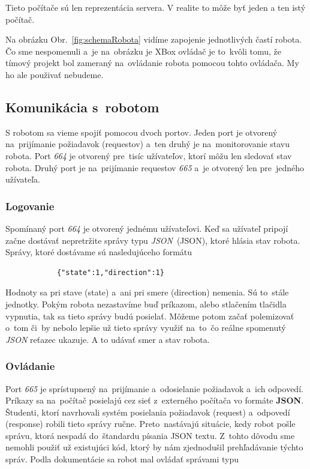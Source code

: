 \noindent Tieto počítače sú len reprezentácia servera. V realite to môže byť jeden a ten istý počítač.

\noindent Na obrázku Obr.~\ref{fig:schemaRobota} vidíme zapojenie jednotlivých častí robota. Čo sme nespomenuli a~je na~obrázku je XBox ovládač
je to~kvôli tomu, že tímový projekt bol zameraný na~ovládanie robota pomocou tohto ovládača. My ho ale použivať nebudeme.

\subsection{Komunikácia s~robotom}

S robotom sa vieme spojiť pomocou dvoch portov. Jeden port je otvorený na~prijímanie požiadavok (requestov) a~ten druhý je na~monitorovanie
stavu robota. Port \textit{664} je otvorený pre~tisíc užívateľov, ktorí môžu len sledovať stav robota. Druhý port je na~prijímanie requestov
\textit{665} a~je otvorený len pre~jedného užívateľa.

\subsubsection{Logovanie}
\label{sec:logovanie}

	Spomínaný port \textit{664} je otvorený jednému užívateľovi. Keď sa užívateľ pripojí začne dostávať nepretržite správy typu
	\textit{JSON}~(\acrlong{JSON}), ktoré hlásia stav robota. Správy, ktoré dostávame sú nasledujúceho formátu

	\begin{lstlisting}
			{"state":1,"direction":1}
	\end{lstlisting}

	Hodnoty sa pri stave (state) a~ani pri smere (direction) nemenia. Sú to~stále jednotky. Pokým robota nezastavíme buď príkazom, alebo
	stlačením tlačidla vypnutia, tak sa tieto správy budú posielať. Môžeme potom začať polemizovať o~tom či~by nebolo lepšie už tieto správy
	využiť na~to~čo reálne spomenutý \textit{JSON} reťazec ukazuje. A to udávať smer a stav robota.

\subsubsection{Ovládanie}
\label{sec:ovladanie}

	Port \textit{665} je sprístupnený na~prijímanie a~odosielanie požiadavok a~ich odpovedí. Príkazy sa na~počítač posielajú cez sieť z~externého
	počítača vo formáte \textbf{JSON}. Študenti, ktorí navrhovali systém posielania požiadavok (request) a~odpovedí (response) robili tieto správy
	ručne. Preto~nastávajú situácie, kedy robot pošle správu, ktorá nespadá do~štandardu písania JSON textu. Z~tohto dôvodu sme nemohli použiť už
	existujúci kód, ktorý by nám zjednodušil prehľadávanie týchto správ. Podla dokumentácie sa robot mal ovládať správami typu~\cite{BMdoc}

